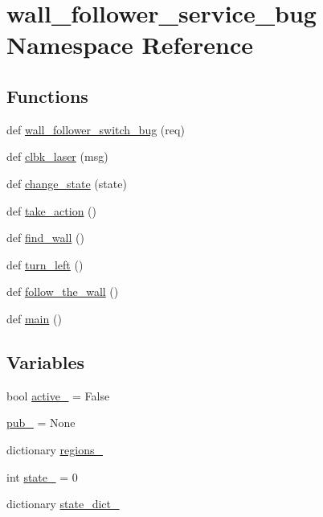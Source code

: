 \hypertarget{namespacewall__follower__service__bug}{}\section{wall\+\_\+follower\+\_\+service\+\_\+bug Namespace Reference}
\label{namespacewall__follower__service__bug}
\subsection*{Functions}
\begin{DoxyCompactItemize}
\item 
def \hyperlink{namespacewall__follower__service__bug_a3d40480bf27a4e840ca68504fa2df3ab}{wall\+\_\+follower\+\_\+switch\+\_\+bug} (req)
\item 
def \hyperlink{namespacewall__follower__service__bug_a8b1d5bfaeda3631c84322d3139853b93}{clbk\+\_\+laser} (msg)
\item 
def \hyperlink{namespacewall__follower__service__bug_ad8938be3e565dc53359f86ffa73dc8ed}{change\+\_\+state} (state)
\item 
def \hyperlink{namespacewall__follower__service__bug_a6dca07c90a8a3a4108f601ede1e7332d}{take\+\_\+action} ()
\item 
def \hyperlink{namespacewall__follower__service__bug_ad7fc86411b01be176df591cf952867e7}{find\+\_\+wall} ()
\item 
def \hyperlink{namespacewall__follower__service__bug_a751a4853e801f3643502f84267a49713}{turn\+\_\+left} ()
\item 
def \hyperlink{namespacewall__follower__service__bug_aaf1e0a62c74840d77f6470c69efdc5fe}{follow\+\_\+the\+\_\+wall} ()
\item 
def \hyperlink{namespacewall__follower__service__bug_ac464970527026f0e4ab2086e8d0f9b09}{main} ()
\end{DoxyCompactItemize}
\subsection*{Variables}
\begin{DoxyCompactItemize}
\item 
bool \hyperlink{namespacewall__follower__service__bug_a2039142388607883c04a31004391c432}{active\+\_\+} = False
\item 
\hyperlink{namespacewall__follower__service__bug_a6a729bbbb58c90a8ad851df7cdb231eb}{pub\+\_\+} = None
\item 
dictionary \hyperlink{namespacewall__follower__service__bug_a17a692ba0d421dab426bc6232daed99e}{regions\+\_\+}
\item 
int \hyperlink{namespacewall__follower__service__bug_a96d928f6c8413cb0f1138c187ca0206a}{state\+\_\+} = 0
\item 
dictionary \hyperlink{namespacewall__follower__service__bug_a4559f30e607293b76c468006cf83eaa3}{state\+\_\+dict\+\_\+}
\end{DoxyCompactItemize}



